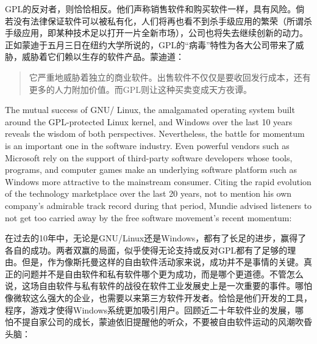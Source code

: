 \ifdefined\chs
GPL的反对者，则恰恰相反。他们声称销售软件和购买软件一样，具有风险。倘若没有法律保证软件可以被私有化，人们将再也看不到杀手级应用的繁荣（所谓杀手级应用，即某种技术足以打开一片全新市场），公司也将失去继续创新的动力。正如蒙迪于五月三日在纽约大学所说的，GPL的``病毒''特性为各大公司带来了威胁，威胁着它们赖以生存的软件产品。蒙迪道：
\begin{quote}
它严重地威胁着独立的商业软件。出售软件不仅仅是要收回发行成本，还有更多的人力附加价值。而GPL则让这种买卖变成天方夜谭。
\end{quote}

\fi

\ifdefined\eng
The mutual success of GNU/ Linux, the amalgamated operating system built around the GPL-protected Linux kernel, and Windows over the last 10 years reveals the wisdom of both perspectives. Nevertheless, the battle for momentum is an important one in the software industry. Even powerful vendors such as Microsoft rely on the support of third-party software developers whose tools, programs, and computer games make an underlying software platform such as Windows more attractive to the mainstream consumer. Citing the rapid evolution of the technology marketplace over the last 20 years, not to mention his own company's admirable track record during that period, Mundie advised listeners to not get too carried away by the free software movement's recent momentum:
\fi

\ifdefined\chs
在过去的10年中，无论是GNU/Linux还是Windows，都有了长足的进步，赢得了各自的成功。两者双赢的局面，似乎使得无论支持或反对GPL都有了足够的理由。但是，作为像斯托曼这样的自由软件活动家来说，成功并不是事情的关键。真正的问题并不是自由软件和私有软件哪个更为成功，而是哪个更道德。不管怎么说，这场自由软件与私有软件的战役在软件工业发展史上是一次重要的事件。哪怕像微软这么强大的企业，也需要以来第三方软件开发者。恰恰是他们开发的工具，程序，游戏才使得Windows系统更加吸引用户。回顾近二十年软件业的发展，哪怕不提自家公司的成长，蒙迪依旧提醒他的听众，不要被自由软件运动的风潮吹昏头脑：
\fi

